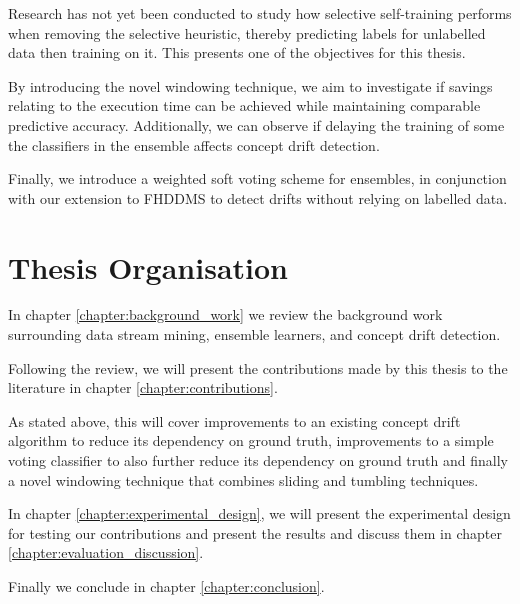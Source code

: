 Research has not yet been conducted to study how selective self-training performs when removing the selective heuristic, thereby predicting labels for unlabelled data then training on it. This presents one of the objectives for this thesis.

By introducing the novel windowing technique, we aim to investigate if savings relating to the execution time can be achieved while maintaining comparable predictive accuracy. Additionally, we can observe if delaying the training of some the classifiers in the ensemble affects concept drift detection.

Finally, we introduce a weighted soft voting scheme for ensembles, in conjunction with our extension to FHDDMS to detect drifts without relying on labelled data.


\section{Thesis Organisation}

In chapter \ref{chapter:background_work} we review the background work surrounding data stream mining, ensemble learners, and concept drift detection.

Following the review, we will present the contributions made by this thesis to the literature in chapter \ref{chapter:contributions}.

As stated above, this will cover improvements to an existing concept drift algorithm to reduce its dependency on ground truth, improvements to a simple voting classifier to also further reduce its dependency on ground truth and finally a novel windowing technique that combines sliding and tumbling techniques.

In chapter \ref{chapter:experimental_design}, we will present the experimental design for testing our contributions and present the results and discuss them in chapter \ref{chapter:evaluation_discussion}.

Finally we conclude in chapter \ref{chapter:conclusion}.